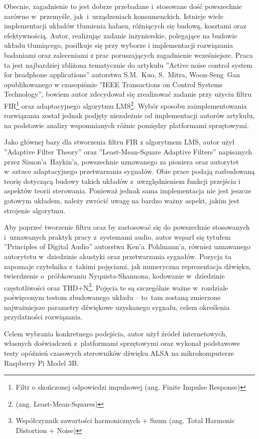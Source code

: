 Obecnie, zagadnienie to jest dobrze przebadane i~stosowane dość powszechnie zarówno w~przemyśle, jak~i~urządzeniach konsumenckich. Istnieje wiele implementacji układów tłumienia hałasu, różniących się budową, kosztami oraz efektywnością. Autor, realizując zadanie inżynierskie, polegające na budowie układu tłumiącego, posiłkuje się przy wyborze i implementacji rozwiązania badaniami oraz zaleceniami z prac poruszających zagadnienie wcześniejsze. Praca ta jest najbardziej zbliżona tematycznie do artykułu ''Active noise control system for headphone applications'' autorstwa S.M.~Kuo, S.~Mitra, Woon-Seng~Gan opublikowanego w czasopiśmie ''IEEE Transactions on Control Systems Technology'', bowiem autor zdecydował się zrealizować zadanie przy użyciu filtru FIR\footnote{Filtr o skończonej odpowiedzi impulsowej (ang. Finite Impulse Response)} oraz  adaptacyjnego algorytmu LMS\footnote{%
(ang. Least-Mean-Squares)}. Wybór sposobu zaimplementowania rozwiązania został jednak podjęty niezależnie od implementacji autorów artykułu, na podstawie analizy wspomnianych różnic pomiędzy platformami sprzętowymi.

Jako głównej bazy dla stworzenia filtru FIR z algorytmem LMS, autor użył ''Adaptive Filter Theory'' oraz ''Least-Mean-Square Adaptive Filters'' napisanych przez Simon'a~Haykin'a, powszechnie uznawanego za pioniera oraz autorytet w~sztuce adaptacyjnego przetwarzania sygnałów. Obie prace podają rozbudowaną teorię dotyczącą budowy takich układów z~uwzględnieniem funkcji przejścia i aspektów teorii sterowania. Ponieważ jednak sama implementacja nie jest jeszcze gotowym układem, należy zwrócić uwagę na bardzo ważny aspekt, jakim jest strojenie algorytmu.

Aby poprzeć tworzenie filtru oraz by zastosować się do powszechnie stosowanych i~uznawanych praktyk pracy z~systemami audio, autor wsparł się tytułem ''Principles of Digital Audio'' autorstwa Ken'a~Pohlmann'a, również uznawanego autorytetu w~dziedzinie akustyki oraz przetwarzania sygnałów. Pozycja ta zapoznaje czytelnika z~takimi pojęciami, jak numeryczna reprezentacja d\'zwięku, twierdzenie o~próbkowaniu Nyquista-Shannona, kodowanie w~dziedzinie częstotliwości oraz THD+N\footnote{Współczynnik zawartości harmonicznych + Szum	(ang. Total Harmonic Distortion + Noise)}. Pojęcia te są szczególnie ważne w~rozdziale poświęconym testom zbudowanego układu -- to~tam zostaną zmierzone najważniejsze parametry d\'zwiękowe uzyskanego sygnału, celem określenia przydatności rozwiązania.

Celem wybrania konkretnego podejścia, autor użył źródeł internetowych, własnych doświadczeń z~platformami sprzętowymi oraz wykonał podstawowe testy opóźnień czasowych sterowników dźwięku ALSA na mikrokomputerze Raspberry Pi Model 3B.

